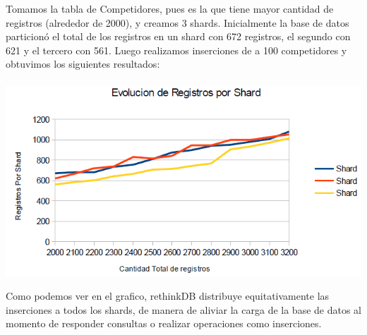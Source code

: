 Tomamos la tabla de Competidores, pues es la que tiene mayor cantidad de 
registros (alrededor de 2000), y creamos 3 shards. Inicialmente la base 
de datos particion\'o el total de los registros en un shard con 672 
registros, el segundo con 621 y el tercero con 561. Luego realizamos 
inserciones de a 100 competidores y obtuvimos los siguientes resultados: \\ \\

\includegraphics[scale=0.75]{Shards.png}

Como podemos ver en el grafico, rethinkDB distribuye equitativamente las 
inserciones a todos los shards, de manera de aliviar la carga de la base 
de datos al momento de responder consultas o realizar operaciones 
como inserciones.
